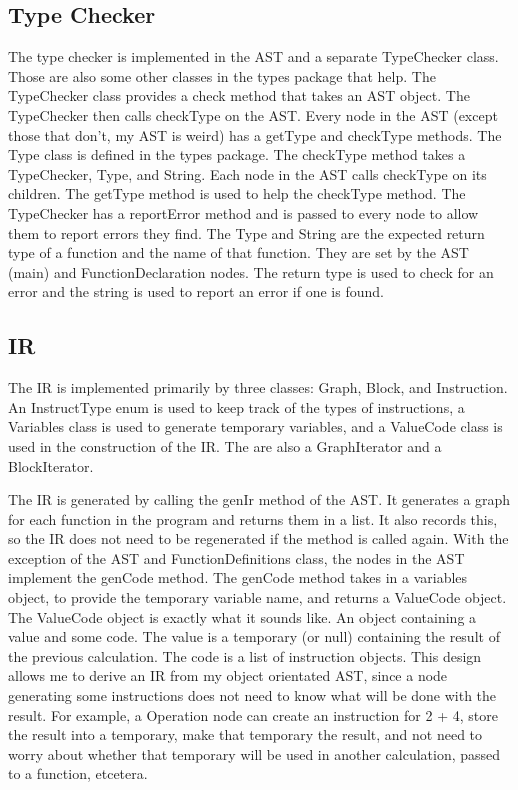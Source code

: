 \subsection*{Type Checker}
The type checker is implemented in the AST and a separate TypeChecker class. Those are also some other classes in the types package that help. The TypeChecker class provides a check method that takes an AST object. The TypeChecker then calls checkType on the AST. Every node in the AST (except those that don't, my AST is weird) has a getType and checkType methods. The Type class is defined in the types package. The checkType method takes a TypeChecker, Type, and String. Each node in the AST calls checkType on its children. The getType method is used to help the checkType method. The TypeChecker has a reportError method and is passed to every node to allow them to report errors they find. The Type and String are the expected return type of a function and the name of that function. They are set by the AST (main) and FunctionDeclaration nodes. The return type is used to check for an error and the string is used to report an error if one is found. 

\subsection*{IR}
The IR is implemented primarily by three classes: Graph, Block, and Instruction. An InstructType enum is used to keep track of the types of instructions, a Variables class is used to generate temporary variables, and a ValueCode class is used in the construction of the IR. The are also a GraphIterator and a BlockIterator. 

The IR is generated by calling the genIr method of the AST. It generates a graph for each function in the program and returns them in a list. It also records this, so the IR does not need to be regenerated if the method is called again. With the exception of the AST and FunctionDefinitions class, the nodes in the AST implement the genCode method. The genCode method takes in a variables object, to provide the temporary variable name, and returns a ValueCode object. The ValueCode object is exactly what it sounds like. An object containing a value and some code. The value is a temporary (or null) containing the result of the previous calculation. The code is a list of instruction objects. This design allows me to derive an IR from my object orientated AST, since a node generating some instructions does not need to know what will be done with the result. For example, a Operation node can create an instruction for 2 + 4, store the result into a temporary, make that temporary the result, and not need to worry about whether that temporary will be used in another calculation, passed to a function, etcetera. 


